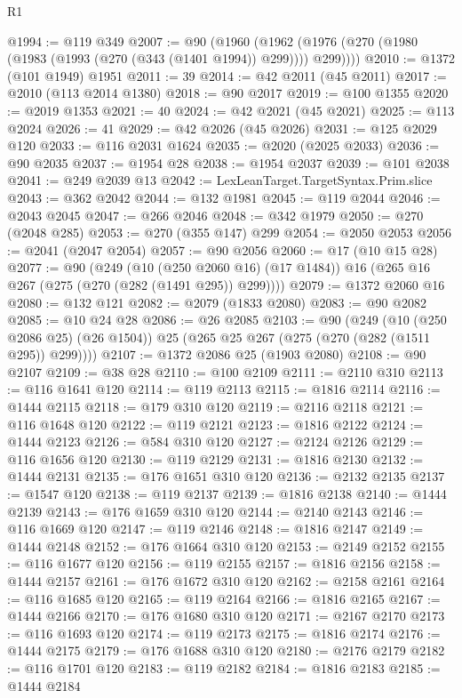 \begin{lexlean}{R1}
\begin{coremodule}
@1994 := @119 @349
@2007 := @90
    (@1960 (@1962 (@1976 (@270 (@1980 (@1983 (@1993 (@270 (@343 (@1401 @1994)) @299)))) @299))))
@2010 := @1372 (@101 @1949) @1951
@2011 := 39
@2014 := @42 @2011 (@45 @2011)
@2017 := @2010 (@113 @2014 @1380)
@2018 := @90 @2017
@2019 := @100 @1355
@2020 := @2019 @1353
@2021 := 40
@2024 := @42 @2021 (@45 @2021)
@2025 := @113 @2024
@2026 := 41
@2029 := @42 @2026 (@45 @2026)
@2031 := @125 @2029 @120
@2033 := @116 @2031 @1624
@2035 := @2020 (@2025 @2033)
@2036 := @90 @2035
@2037 := @1954 @28
@2038 := @1954 @2037
@2039 := @101 @2038
@2041 := @249 @2039 @13
@2042 := LexLeanTarget.TargetSyntax.Prim.slice
@2043 := @362 @2042
@2044 := @132 @1981
@2045 := @119 @2044
@2046 := @2043 @2045
@2047 := @266 @2046
@2048 := @342 @1979
@2050 := @270 (@2048 @285)
@2053 := @270 (@355 @147) @299
@2054 := @2050 @2053
@2056 := @2041 (@2047 @2054)
@2057 := @90 @2056
@2060 := @17 (@10 @15 @28)
@2077 := @90
    (@249
      (@10 (@250 @2060 @16) (@17 @1484))
      @16
      (@265 @16 @267 (@275 (@270 (@282 (@1491 @295)) @299))))
@2079 := @1372 @2060 @16
@2080 := @132 @121
@2082 := @2079 (@1833 @2080)
@2083 := @90 @2082
@2085 := @10 @24 @28
@2086 := @26 @2085
@2103 := @90
    (@249
      (@10 (@250 @2086 @25) (@26 @1504))
      @25
      (@265 @25 @267 (@275 (@270 (@282 (@1511 @295)) @299))))
@2107 := @1372 @2086 @25 (@1903 @2080)
@2108 := @90 @2107
@2109 := @38 @28
@2110 := @100 @2109
@2111 := @2110 @310
@2113 := @116 @1641 @120
@2114 := @119 @2113
@2115 := @1816 @2114
@2116 := @1444 @2115
@2118 := @179 @310 @120
@2119 := @2116 @2118
@2121 := @116 @1648 @120
@2122 := @119 @2121
@2123 := @1816 @2122
@2124 := @1444 @2123
@2126 := @584 @310 @120
@2127 := @2124 @2126
@2129 := @116 @1656 @120
@2130 := @119 @2129
@2131 := @1816 @2130
@2132 := @1444 @2131
@2135 := @176 @1651 @310 @120
@2136 := @2132 @2135
@2137 := @1547 @120
@2138 := @119 @2137
@2139 := @1816 @2138
@2140 := @1444 @2139
@2143 := @176 @1659 @310 @120
@2144 := @2140 @2143
@2146 := @116 @1669 @120
@2147 := @119 @2146
@2148 := @1816 @2147
@2149 := @1444 @2148
@2152 := @176 @1664 @310 @120
@2153 := @2149 @2152
@2155 := @116 @1677 @120
@2156 := @119 @2155
@2157 := @1816 @2156
@2158 := @1444 @2157
@2161 := @176 @1672 @310 @120
@2162 := @2158 @2161
@2164 := @116 @1685 @120
@2165 := @119 @2164
@2166 := @1816 @2165
@2167 := @1444 @2166
@2170 := @176 @1680 @310 @120
@2171 := @2167 @2170
@2173 := @116 @1693 @120
@2174 := @119 @2173
@2175 := @1816 @2174
@2176 := @1444 @2175
@2179 := @176 @1688 @310 @120
@2180 := @2176 @2179
@2182 := @116 @1701 @120
@2183 := @119 @2182
@2184 := @1816 @2183
@2185 := @1444 @2184

\end{coremodule}
\end{lexlean}
